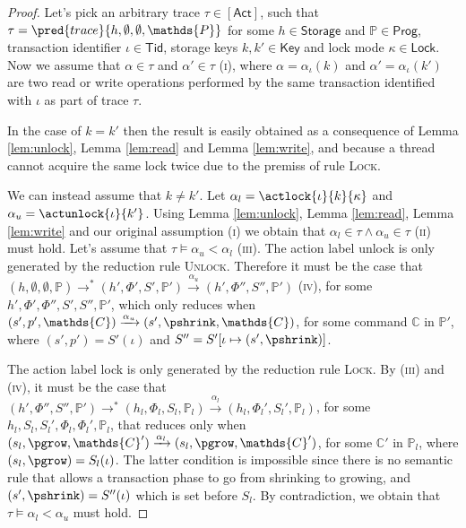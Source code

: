 \begin{proof}
Let's pick an arbitrary trace $\tau \in \mathsf{[Act]}$, such that $\tau = \pred{trace}{h, \emptyset, \emptyset, \mathds{P}}$ for some $h \in \mathsf{Storage}$ and $\mathds{P} \in \mathsf{Prog}$, transaction identifier $\iota \in \mathsf{Tid}$, storage keys $k, k' \in \mathsf{Key}$ and lock mode $\kappa \in \mathsf{Lock}$. Now we assume that  $\alpha \in \tau$ and $\alpha' \in \tau$ (\textsc{i}), where $\alpha = \alpha_\iota(k)$ and $\alpha' = \alpha_\iota(k')$ are two read or write operations performed by the same transaction identified with $\iota$ as part of trace $\tau$.

In the case of $k = k'$ then the result is easily obtained as a consequence of Lemma \ref{lem:unlock}, Lemma \ref{lem:read} and Lemma \ref{lem:write}, and because a thread cannot acquire the same lock twice due to the premiss of rule \textsc{Lock}.

We can instead assume that $k \neq k'$. Let $\alpha_l = \actlock{\iota}{k}{\kappa}$ and $\alpha_u = \actunlock{\iota}{k'}$. Using Lemma \ref{lem:unlock}, Lemma \ref{lem:read}, Lemma \ref{lem:write} and our original assumption (\textsc{i}) we obtain that $\alpha_l \in \tau \land \alpha_u \in \tau$ (\textsc{ii}) must hold. Let's assume that $\tau \vDash \alpha_u < \alpha_l$ (\textsc{iii}). The action label \textsf{unlock} is only generated by the reduction rule \textsc{Unlock}. Therefore it must be the case that $(h, \emptyset, \emptyset, \mathds{P}) \rightarrow^* (h', \Phi', S', \mathds{P}') \xrightarrow{\alpha_u} (h', \Phi'', S'', \mathds{P}')$ (\textsc{iv}), for some $h', \Phi', \Phi'', S', S'', \mathds{P}'$, which only reduces when $(s', p', \mathds{C}) \xrightarrow{\alpha_u} (s', \pshrink, \mathds{C})$, for some command $\mathds{C}$ in $\mathds{P}'$, where $(s', p') = S'(\iota)$ and $S'' = S'[\iota \mapsto (s', \pshrink)]$.

The action label \textsf{lock} is only generated by the reduction rule \textsc{Lock}. By (\textsc{iii}) and (\textsc{iv}), it must be the case that $(h', \Phi'', S'', \mathds{P}') \rightarrow^* (h_l, \Phi_l, S_l, \mathds{P}_l) \xrightarrow{\alpha_l} (h_l, \Phi_l', S_l', \mathds{P}_l)$, for some $h_l, S_l, S_l', \Phi_l, \Phi_l', \mathds{P}_l$, that reduces only when $(s_l, \pgrow, \mathds{C}') \xrightarrow{\alpha_l} (s_l, \pgrow, \mathds{C}')$, for some $\mathds{C}'$ in $\mathds{P}_l$, where $(s_l, \pgrow) = S_l(\iota)$. The latter condition is impossible since there is no semantic rule that allows a transaction phase to go from shrinking to growing, and $(s', \pshrink) = S''(\iota)$ which is set before $S_l$. By contradiction, we obtain that $\tau \vDash \alpha_l < \alpha_u$ must hold.
\end{proof}